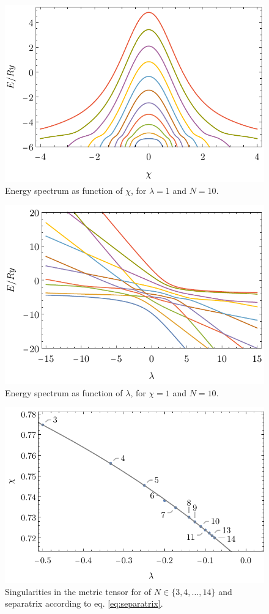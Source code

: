 \begin{figure}[h]
    \centering
    \includegraphics{../img/N=10_energiesl.pdf}
    \caption{Energy spectrum as function of $\chi$, for $\lambda=1$ and $N=10$.}
    \label{fig:N=10_energiesl}    
\end{figure}
\begin{figure}[h]
    \centering
    \includegraphics{../img/N=10_energies2.pdf}
    \caption{Energy spectrum as function of $\lambda$, for $\chi=1$ and $N=10$.}
    \label{fig:N=10_energies2}    
\end{figure}

\begin{figure}[h]
    \centering
    \includegraphics{../img/divPosition.pdf}
    \caption{Singularities in the metric tensor for of $N\in\{3,4,\dots ,14\}$ and separatrix according to eq. \ref{eq:separatrix}.}
    \label{fig:singularitiesRegr}    
\end{figure}


